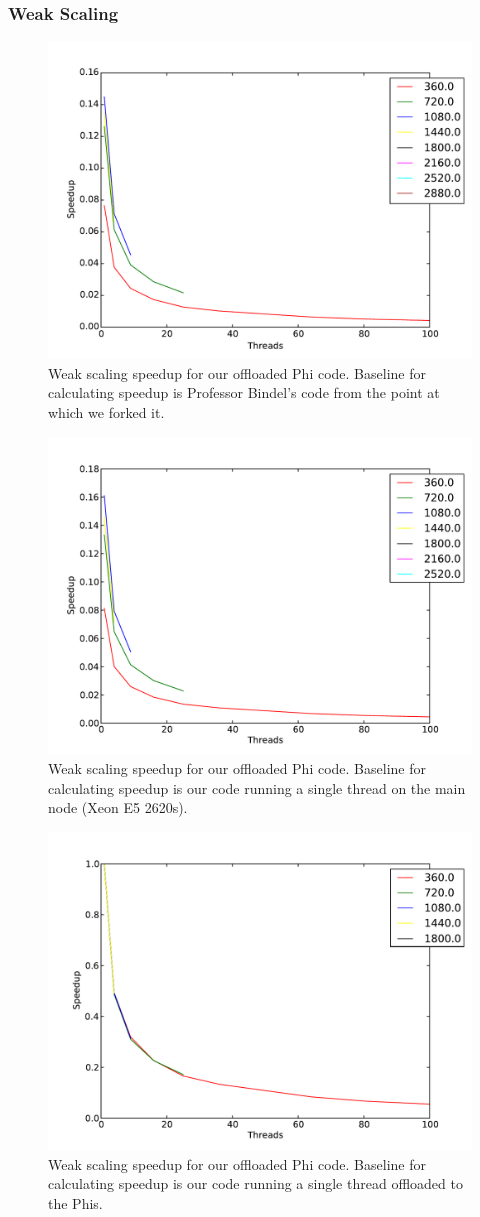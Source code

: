 \documentclass[11pt]{article}
\begin{document}
\subsubsection{Weak Scaling}
\begin{figure}[h!]
\includegraphics[width=0.5\linewidth]{mic_weak_bindel_baseline.pdf}
\caption{Weak scaling speedup for our offloaded Phi code. Baseline for calculating speedup is Professor Bindel's code from the point at which we forked it.}
\end{figure}

\begin{figure}[h!]
\includegraphics[width=0.5\linewidth]{mic_weak_e5_baseline.pdf}
\caption{Weak scaling speedup for our offloaded Phi code. Baseline for calculating speedup is our code running a single thread on the main node (Xeon E5 2620s).}
\end{figure}

\begin{figure}[h!]
\includegraphics[width=0.5\linewidth]{mic_weak_mic_baseline.pdf}
\caption{Weak scaling speedup for our offloaded Phi code. Baseline for calculating speedup is our code running a single thread offloaded to the Phis.}
\end{figure}
\end{document}
